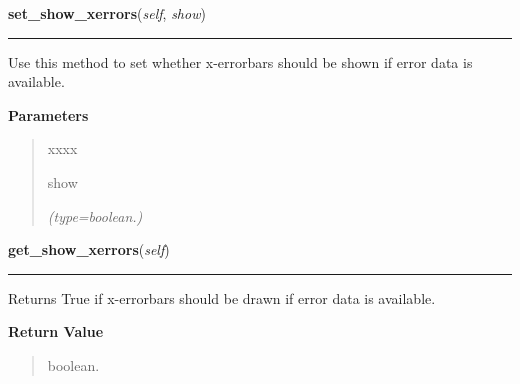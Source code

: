     \label{pygtk_chart:line_chart:Graph:set_show_xerrors}

    \vspace{0.5ex}

\hspace{.8\funcindent}\begin{boxedminipage}{\funcwidth}

    \raggedright \textbf{set\_show\_xerrors}(\textit{self}, \textit{show})

    \vspace{-1.5ex}

    \rule{\textwidth}{0.5\fboxrule}
\setlength{\parskip}{2ex}
    Use this method to set whether x-errorbars should be shown if error 
    data is available.

\setlength{\parskip}{1ex}
      \textbf{Parameters}
      \vspace{-1ex}

      \begin{quote}
        \begin{Ventry}{xxxx}

          \item[show]

            {\it (type=boolean.)}

        \end{Ventry}

      \end{quote}

    \end{boxedminipage}

    \label{pygtk_chart:line_chart:Graph:get_show_xerrors}

    \vspace{0.5ex}

\hspace{.8\funcindent}\begin{boxedminipage}{\funcwidth}

    \raggedright \textbf{get\_show\_xerrors}(\textit{self})

    \vspace{-1.5ex}

    \rule{\textwidth}{0.5\fboxrule}
\setlength{\parskip}{2ex}
    Returns True if x-errorbars should be drawn if error data is available.

\setlength{\parskip}{1ex}
      \textbf{Return Value}
    \vspace{-1ex}

      \begin{quote}
      boolean.

      \end{quote}

    \end{boxedminipage}

